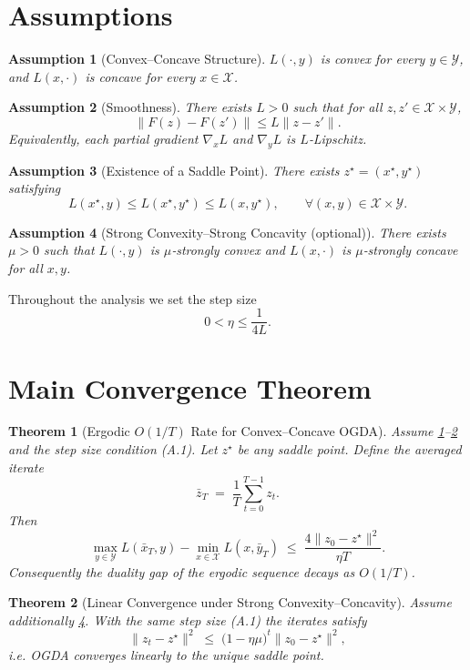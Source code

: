 \documentclass[11pt]{article}
\newtheorem{theorem}{Theorem}[section]
\newtheorem{assumption}{Assumption}[section]
\begin{document}
\section*{Assumptions}
\begin{assumption}[Convex–Concave Structure]\label{ass:cc}
$L(\cdot,y)$ is convex for every $y\in\mathcal Y$, and $L(x,\cdot)$ is concave for every $x\in\mathcal X$.
\end{assumption}
\begin{assumption}[Smoothness]\label{ass:smooth}
There exists $L>0$ such that for all $z,z'\in\mathcal X\times\mathcal Y$,
\[
\|F(z)-F(z')\|\le L\|z-z'\|.
\]
Equivalently, each partial gradient $\nabla_x L$ and $\nabla_y L$ is $L$‑Lipschitz.
\end{assumption}
\begin{assumption}[Existence of a Saddle Point]\label{ass:saddle}
There exists $z^{\star}=(x^{\star},y^{\star})$ satisfying
\[
L(x^{\star},y)\le L(x^{\star},y^{\star})\le L(x,y^{\star}),\qquad\forall(x,y)\in\mathcal X\times\mathcal Y.
\]
\end{assumption}
\begin{assumption}[Strong Convexity–Strong Concavity (optional)]\label{ass:strong}
There exists $\mu>0$ such that $L(\cdot,y)$ is $\mu$‑strongly convex and $L(x,\cdot)$ is $\mu$‑strongly concave for all $x,y$.
\end{assumption}

Throughout the analysis we set the step size
\[
0<\eta\le\frac{1}{4L}.
\tag{A.1}
\]

\section*{Main Convergence Theorem}
\begin{theorem}[Ergodic $O(1/T)$ Rate for Convex–Concave OGDA]\label{thm:ergodic}
Assume \ref{ass:cc}–\ref{ass:smooth} and the step size condition (A.1).  
Let $z^{\star}$ be any saddle point. Define the averaged iterate
\[
\bar z_T\;=\;\frac{1}{T}\sum_{t=0}^{T-1}z_t.
\]
Then
\[
\max_{y\in\mathcal Y}L(\bar x_T,y)-\min_{x\in\mathcal X}L(x,\bar y_T)
\;\le\;\frac{4\|z_0-z^{\star}\|^2}{\eta T}.
\tag{3}
\]
Consequently the duality gap of the ergodic sequence decays as $O(1/T)$.
\end{theorem}
\begin{theorem}[Linear Convergence under Strong Convexity–Concavity]\label{thm:linear}
Assume additionally \ref{ass:strong}. With the same step size (A.1) the iterates satisfy
\[
\|z_t-z^{\star}\|^2\;\le\;\big(1-\eta\mu\big)^t\|z_0-z^{\star}\|^2,
\tag{4}
\]
i.e. OGDA converges linearly to the unique saddle point.
\end{theorem}
\end{document}
